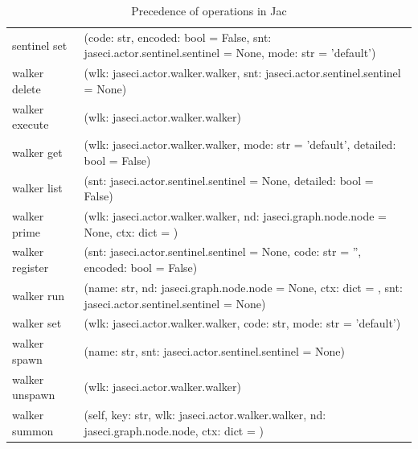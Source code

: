 {\begin{table}[ht]
\begin{tabular}{l p{10cm}}
            sentinel set           & (code: str, encoded: bool = False, snt: jaseci.actor.sentinel.sentinel = None, mode: str = 'default')                 \\
            walker delete          & (wlk: jaseci.actor.walker.walker, snt: jaseci.actor.sentinel.sentinel = None)                                         \\
            walker execute         & (wlk: jaseci.actor.walker.walker)                                                                                     \\
            walker get             & (wlk: jaseci.actor.walker.walker, mode: str = 'default', detailed: bool = False)                                      \\
            walker list            & (snt: jaseci.actor.sentinel.sentinel = None, detailed: bool = False)                                                  \\
            walker prime           & (wlk: jaseci.actor.walker.walker, nd: jaseci.graph.node.node = None, ctx: dict = {})                                  \\
            walker register        & (snt: jaseci.actor.sentinel.sentinel = None, code: str = '', encoded: bool = False)                                   \\
            walker run             & (name: str, nd: jaseci.graph.node.node = None, ctx: dict = {}, snt: jaseci.actor.sentinel.sentinel = None)            \\
            walker set             & (wlk: jaseci.actor.walker.walker, code: str, mode: str = 'default')                                                   \\
            walker spawn           & (name: str, snt: jaseci.actor.sentinel.sentinel = None)                                                               \\
            walker unspawn         & (wlk: jaseci.actor.walker.walker)                                                                                     \\
            walker summon          & (self, key: str, wlk: jaseci.actor.walker.walker, nd: jaseci.graph.node.node, ctx: dict = {})                         \\

            \bottomrule
        \end{tabular}
        \caption{Precedence of operations in Jac}
        \label{tab:jsAPI}
    \end{table}
}
